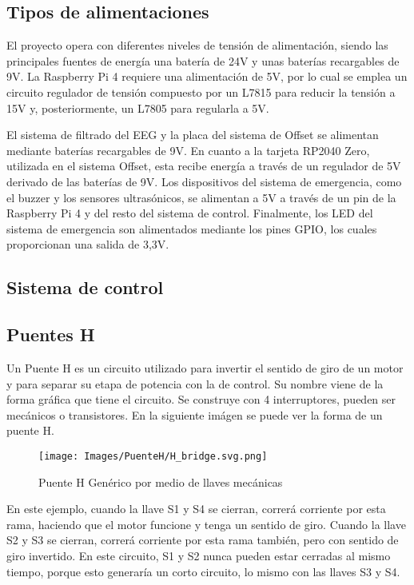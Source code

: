 \documentclass{article}
\begin{document}
\subsection{Tipos de alimentaciones}

El proyecto opera con diferentes niveles de tensión de alimentación, siendo las principales fuentes de energía una batería de 24V y unas baterías recargables de 9V. La Raspberry Pi 4 requiere una alimentación de 5V, por lo cual se emplea un circuito regulador de tensión compuesto por un L7815 para reducir la tensión a 15V y, posteriormente, un L7805 para regularla a 5V.

El sistema de filtrado del EEG y la placa del sistema de Offset se alimentan mediante baterías recargables de 9V. En cuanto a la tarjeta RP2040 Zero, utilizada en el sistema Offset, esta recibe energía a través de un regulador de 5V derivado de las baterías de 9V. Los dispositivos del sistema de emergencia, como el buzzer y los sensores ultrasónicos, se alimentan a 5V a través de un pin de la Raspberry Pi 4 y del resto del sistema de control. Finalmente, los LED del sistema de emergencia son alimentados mediante los pines GPIO, los cuales proporcionan una salida de 3,3V.

\subsection{Sistema de control}

\subsection{Puentes H}
Un Puente H es un circuito utilizado para invertir el sentido de giro de un motor y para separar su etapa de potencia con la de control. Su nombre viene de la forma gráfica que tiene el circuito. Se construye con 4 interruptores, pueden ser mecánicos o transistores. En la siguiente imágen se puede ver la forma de un puente H.

\begin{figure}[H]
    \centering
    \texttt{[image: Images/PuenteH/H\_bridge.svg.png]}
    \caption{Puente H Genérico por medio de llaves mecánicas}
\end{figure}

En este ejemplo, cuando la llave S1 y S4 se cierran, correrá corriente por esta rama, haciendo que el motor funcione y tenga un sentido de giro. Cuando la llave S2 y S3 se cierran, correrá corriente por esta rama también, pero con sentido de giro invertido. En este circuito, S1 y S2 nunca pueden estar cerradas al mismo tiempo, porque esto generaría un corto circuito, lo mismo con las llaves S3 y S4.
\end{document}
